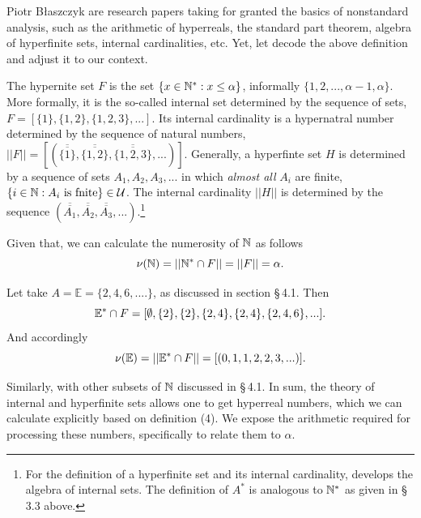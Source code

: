 \begin{artengenv}{Piotr Błaszczyk}
\parencites{ref_BN14}{ref_BN15} are research papers taking for granted the basics of nonstandard analysis, such as the arithmetic of hyperreals, the standard part theorem,  algebra of hyperfinite sets,  internal cardinalities, etc. 
Yet, let decode the above definition and adjust it to our context. 

The hypernite set $F$ is 
the set $\{x\in {\mathbb{N}}^*: x\leq \alpha\}$, informally $\{1,2,..., \alpha-1, \alpha\}$. More formally, it is the so-called internal set determined by the sequence of sets, $F=[\{1\},\{1,2\},\{1,2,3\}, ...]$. Its internal cardinality is a hypernatral number determined by the sequence of natural numbers, 
$||F||=[(\overline{\overline{\{1\}}},\overline{\overline{\{1,2\}}},\overline{\overline{\{1,2,3\}}}, ...)]$.
Generally, a hyperfinte set $H$ is determined by a sequence of sets $A_1, A_2, A_3,...$ in which \textit{almost all} $A_i$ are finite, $\{i\in\N: A_i\ \mbox{is\ fnite}\}\in\mathcal U$. The internal cardinality $||H||$ is determined by the sequence $(\overline{\overline{A_1}}, \overline{\overline{A_2}}, \overline{\overline{A_3}},...)$.\footnote{For the definition of a hyperfinite set and its internal cardinality, \parencites[see][\S\,12]{ref_rg} [\S\,11]{ref_rg} develops the algebra of internal sets. The definition of $A^*$ is analogous to ${\mathbb{N}}^*$ as given in \S\,3.3 above. }

Given that, we can calculate the numerosity of ${\mathbb{N}}$ as follows
\[\nu ({\mathbb{N}})=||{\mathbb{N}}^*\cap F||=||F||=\alpha.\]

Let take $A=\mathbb E=\{2,4, 6,....\}$, as discussed in section \S\,4.1.
Then 
\[{\mathbb{E}}^*\cap F=[\emptyset, \{2\}, \{2\}, \{2,4\}, \{2, 4\},\{2, 4, 6\},...].\] 
And accordingly
\[\nu ({\mathbb{E}})=||{\mathbb{E}}^*\cap F||=[(0,1, 1, 2, 2, 3, ...)].\]

Similarly, with other subsets of ${\mathbb{N}}$ discussed in \S\,4.1. In sum, the theory of internal and hyperfinite sets allows one to get hyperreal numbers, which we can calculate explicitly based on definition (4). We expose the arithmetic required for processing these numbers, specifically to relate them to $\alpha$.  


\end{artengenv}
